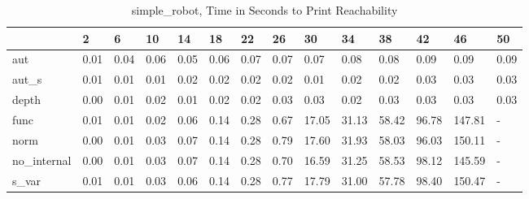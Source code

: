 \begin{table}
\caption{simple_robot, Time in Seconds to Print Reachability}
\label{simple_robot_states_time}
\begin{tabular}{llllllllllllll}
\toprule
 & 2 & 6 & 10 & 14 & 18 & 22 & 26 & 30 & 34 & 38 & 42 & 46 & 50 \\
\midrule
aut & 0.01 & 0.04 & 0.06 & 0.05 & 0.06 & 0.07 & 0.07 & 0.07 & 0.08 & 0.08 & 0.09 & 0.09 & 0.09 \\
aut_s & 0.01 & 0.01 & 0.01 & 0.02 & 0.02 & 0.02 & 0.02 & 0.01 & 0.02 & 0.02 & 0.03 & 0.03 & 0.03 \\
depth & 0.00 & 0.01 & 0.02 & 0.01 & 0.02 & 0.02 & 0.03 & 0.03 & 0.02 & 0.03 & 0.03 & 0.03 & 0.03 \\
func & 0.01 & 0.01 & 0.02 & 0.06 & 0.14 & 0.28 & 0.67 & 17.05 & 31.13 & 58.42 & 96.78 & 147.81 & - \\
norm & 0.00 & 0.01 & 0.03 & 0.07 & 0.14 & 0.28 & 0.79 & 17.60 & 31.93 & 58.03 & 96.03 & 150.11 & - \\
no_internal & 0.00 & 0.01 & 0.03 & 0.07 & 0.14 & 0.28 & 0.70 & 16.59 & 31.25 & 58.53 & 98.12 & 145.59 & - \\
s_var & 0.01 & 0.01 & 0.03 & 0.06 & 0.14 & 0.28 & 0.77 & 17.79 & 31.00 & 57.78 & 98.40 & 150.47 & - \\
\bottomrule
\end{tabular}
\end{table}
